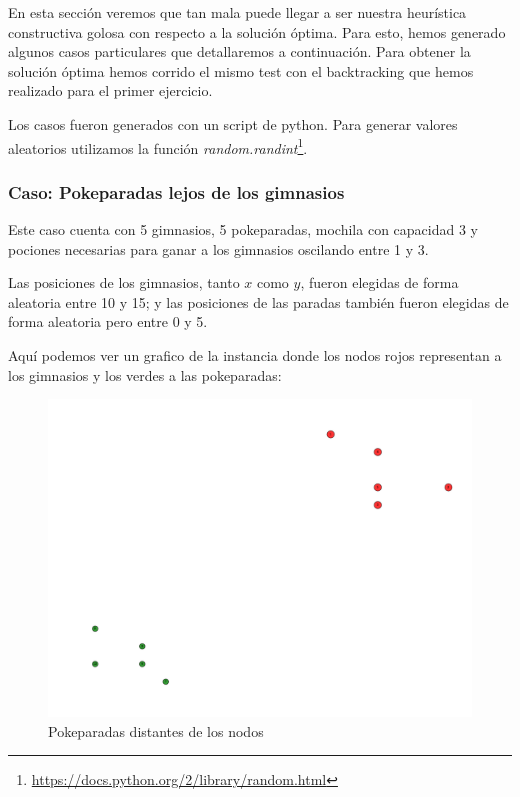 En esta sección veremos que tan mala puede llegar a ser nuestra heurística constructiva golosa con respecto a la solución óptima. Para esto, hemos generado algunos casos particulares que detallaremos a continuación. Para obtener la solución óptima hemos corrido el mismo test con el backtracking que hemos realizado para el primer ejercicio.

Los casos fueron generados con un script de python. Para generar valores aleatorios utilizamos la función \textit{random.randint}\footnote{\url{https://docs.python.org/2/library/random.html}}.

\subsubsection{Caso: Pokeparadas lejos de los gimnasios}

Este caso cuenta con 5 gimnasios, 5 pokeparadas, mochila con capacidad 3 y pociones necesarias para ganar a los gimnasios oscilando entre 1 y 3.

Las posiciones de los gimnasios, tanto $x$ como $y$, fueron elegidas de forma aleatoria entre 10 y 15; y las posiciones de las paradas también fueron elegidas de forma aleatoria pero entre 0 y 5. 

Aquí podemos ver un grafico de la instancia donde los nodos rojos representan a los gimnasios y los verdes a las pokeparadas:

\begin{figure}[H]
  \begin{center}
    \includegraphics[scale=0.4]{imagenes/test1.pdf}
    \caption{Pokeparadas distantes de los nodos}
    \label{fig:ej2_caso1}
  \end{center}
\end{figure}


